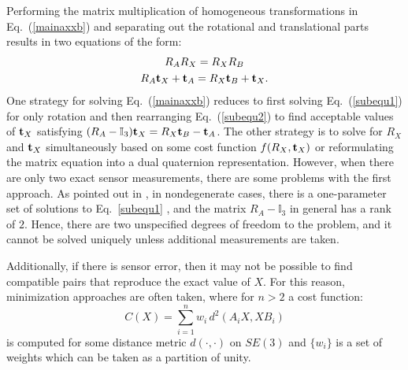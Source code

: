 \documentclass[twocolumn,10pt]{asme2ej}
\newcommand{\ttt}{{\bf t}}
\begin{document}
Performing the matrix multiplication of homogeneous transformations in Eq.~(\ref{mainaxxb}) and separating out the rotational and translational parts results in two equations of the form:
\begin{subequations}
\begin{gather}
R_A R_X = R_X R_B \label{subequ1}\\
R_A {\bf t}_X + {\bf t}_A = R_X {\bf t}_B + {\bf t}_X \label{subequ2}.
\end{gather}
\label{axxb}
\end{subequations}
One strategy for solving Eq.~(\ref{mainaxxb}) reduces to first solving Eq.~(\ref{subequ1}) for only rotation and then rearranging Eq.~(\ref{subequ2}) to find acceptable values of ${\bf t}_X$ satisfying $ (R_A - \mathbb{I}_{3}) {\bf t}_X = R_X {\bf t}_B - {\bf t}_A$.
The other strategy is to solve for $R_{X}$ and $\ttt_{X}$ simultaneously based on some cost function $f(R_{X}, \ttt_{X})$ or reformulating the matrix equation into a dual quaternion representation. %
However, when there are only two exact sensor measurements, there are some problems with the first  approach. As pointed out in \cite{park1994robot,shiu1989calibration}, in nondegenerate cases, there is a one-parameter set of solutions to Eq.~\ref{subequ1}%
, and the matrix $R_A - \mathbb{I}_{3}$ in general has a rank of $2$. Hence, there are two unspecified degrees of freedom to the
problem, and it cannot be solved uniquely unless additional measurements are taken. 

Additionally, if there is sensor error, then it may not be possible to find compatible pairs that reproduce the exact value of $X$. For this reason, minimization approaches are often taken, where for $n>2$ a cost function:
\begin{equation}
C(X) = \sum_{i=1}^{n} w_i \, d^2(A_i X,X B_i)
\label{mainaxxb2}
\end{equation}
is computed for some distance metric $d(\cdot,\cdot)$ on $SE(3)$ and $\{w_i\}$ is a set of weights which can be taken as a partition of unity. 
\end{document}
